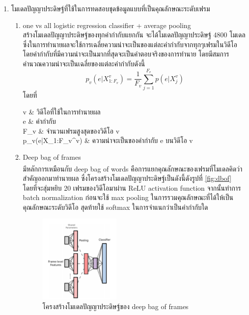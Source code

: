 \begin{enumerate}
\begin{enumerate}
		\item โมเดลปัญญาประดิษฐ์ที่ใช้ในการทดสอบชุดข้อมูลแบบที่เป็นคุณลักษณะระดับเฟรม
			\begin{enumerate}
				\setlength\itemsep{-0.25em}
				\item one vs all logistic regression classifier + average pooling\\ 
				สร้างโมเดลปัญญาประดิษฐ์ของทุกคำกำกับแยกกัน จะได้โมเดลปัญญาประดิษฐ์ 4800 โมเดล ซึ่งในการทำนายผลจะใช้การเฉลี่ยความน่าจะเป็นของแต่ละคำกำกับจากทุกๆเฟรมในวิดีโอ
				โดยคำกำกับที่มีความน่าจะเป็นมากที่สุดจะเป็นคำตอบจริงของการทำนาย โดยมีสมการคำนวณความน่าจะเป็นเฉลี่ยของแต่ละคำกำกับดังนี้
				\begin{equation}
					p_v(e|X_{1:F_v}^v) = \frac{1}{F_v} \sum_{j=1}^{F_v}p(e|X^v_j)
				\end{equation}
				โดยที่
				\begin{conditions}
					v      		&  วิดีโอที่ใช้ในการทำนายผล  \\   
					e 			&  คำกำกับ								\\
					F_v 		&  จำนวนเฟรมสูงสุดของวิดีโอ v	\\
					p_v(e|X_{1:F_v}^v)     	&  ความน่าจะเป็นของคำกำกับ e บนวิดีโอ v	\\
				\end{conditions}
				\item Deep bag of frames\\
				มีหลักการเหมือนกับ deep bag of words\textsuperscript{\cite{liu20172}} คือการแยกคุณลักษณะของเฟรมที่โมเดลคิดว่าสำคัญออกมาทำนายผล 
				ซึ่งโครงสร้างโมเดลปัญญาประดิษฐ์เป็นดังนี้ดังรูปที่ \ref{fig:dbof} โดยที่จะสุ่มหยิบ 20 เฟรมของวิดีโอมาผ่าน ReLU activation function
				จากนั้นทำการ batch normalization ก่อนจะใช้ max pooling ในการรวมคุณลักษณะที่ได้ให้เป็นคุณลักษณะระดับวิดีโอ สุดท้ายใช้ softmax ในการจำแนกว่าเป็นคำกำกับใด
				\begin{figure}[!ht]
					\centering
					\includegraphics[width=0.4\textwidth]{chapter2/images/DBoF.png}
					\caption{โครงสร้างโมเดลปัญญาประดิษฐ์ของ deep bag of frames}

\end{figure}
\end{enumerate}
\end{enumerate}
\end{enumerate}
